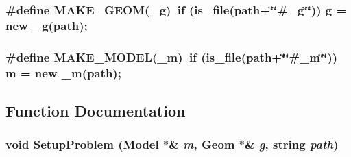 \subsubsection{\setlength{\rightskip}{0pt plus 5cm}\#define MAKE\_\-GEOM(\_\-g)\ if (is\_\-file(path+\char`\"{}\char`\"{}\#\_\-g\char`\"{}\char`\"{})) g = new \_\-g(path);}\label{setup_8C_a1}


\subsubsection{\setlength{\rightskip}{0pt plus 5cm}\#define MAKE\_\-MODEL(\_\-m)\ if (is\_\-file(path+\char`\"{}\char`\"{}\#\_\-m\char`\"{}\char`\"{})) m = new \_\-m(path);}\label{setup_8C_a0}




\subsection{Function Documentation}
\subsubsection{\setlength{\rightskip}{0pt plus 5cm}void Setup\-Problem ({\bf Model} $\ast$\& {\em m}, {\bf Geom} $\ast$\& {\em g}, string {\em path})}\label{setup_8C_a2}


